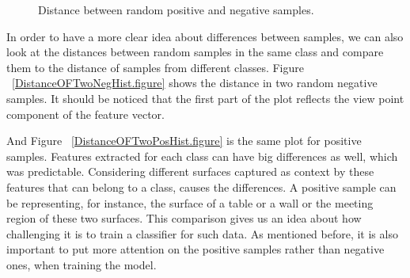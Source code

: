 



\begin{figure}[t]
  \caption[Distance of Positive and Negative samples]
  {Distance between random positive and negative samples.}
  \label{DistanceOFPosandNegHist.figure}
\end{figure}

In order to have a more clear idea about differences between samples, we can also look at the distances between random samples
in the same class and compare them to the distance of samples from different classes. 
Figure ~\ref{DistanceOFTwoNegHist.figure} shows the distance in two random negative samples. 
It should be noticed that the first part of the plot reflects the view point component of the feature vector.
 


And Figure ~\ref{DistanceOFTwoPosHist.figure} is the same plot for positive samples. 
Features extracted for each class can have big differences as well, which was predictable. 
Considering different surfaces captured as context by these features that can belong to a class, causes the differences. 
A positive sample can be representing, for instance, the surface of a table or a wall or the meeting region of these 
two surfaces. 
This comparison gives us an idea about how challenging it is to train a classifier for such data.
As mentioned before, it is also important to put more attention on the positive samples rather than negative ones, when training the model. 



